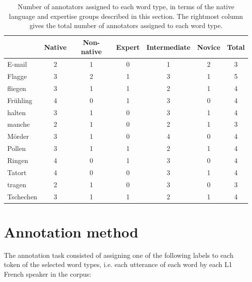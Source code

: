 	\begin{table}[p]
		\centering
		\caption[Number of annotators assigned to each word type]{Number of annotators assigned to each word type, in terms of the native language and expertise groups described in this section. The rightmost column gives the total number of annotators assigned to each word type.}
		\begin{tabular}{lcccccc}
		\toprule
		&		Native %
		& 	Non-native %
		& Expert
		& Intermediate
		& Novice
		& Total %
		\\
		\midrule
		E-mail			& 2 	& 1 	&	0	&	1	&	2	& 3 \\
		Flagge			& 3	& 2	&	1	&	3	&	1	& 5 \\
		fliegen			& 3	& 1	&	1	&	2	&	1	& 4 \\
		Frühling		& 4	& 0	&	1	&	3	&	0	& 4 \\
		halten			& 3	& 1	&	0	&	3	&	1	& 4 \\
		manche		& 2	& 1	&	0	&	2	&	1	& 3 \\
		Mörder 		& 3	& 1	&	0	&	4	&	0	& 4 \\
		Pollen			& 3	& 1	&	1	&	2	&	1	& 4 \\
		Ringen			& 4	& 0	&	1	&	3	&	0	& 4 \\
		Tatort			& 4	& 0	&	0	&	3	&	1	& 4 \\
		tragen			& 2	& 1	&	0	&	3	&	0	& 3 \\
		Tschechen 	& 3	& 1	&	1	&	2	&	1	& 4 \\
		\bottomrule
		\end{tabular}
		\label{tab:annotatorsbyword}
	\end{table}
	
	
	
	\section{Annotation method}
	\label{sec:lexstress:method}

	The annotation task consisted of assigning one of the following labels to 
	each token of the selected word types, i.e. each utterance of each word by each L1 French speaker in the corpus:
	
